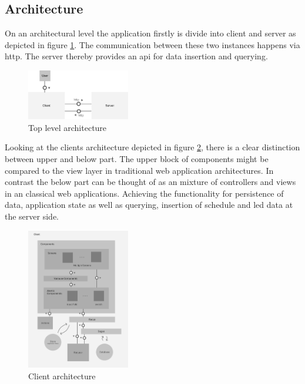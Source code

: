 \documentclass[conference]{IEEEtran}
\begin{document}
\subsection{Architecture}
On an architectural level the application firstly is divide into client and server as depicted in figure \ref{topLevelArch}.
The communication between these two instances happens via http. The server thereby provides an api for data insertion and
querying.

\begin{figure}[H]
    \centering
    \includegraphics[width=0.4\textwidth]{top_level_architecture}
    \caption{Top level architecture}
    \label{topLevelArch}
\end{figure}

Looking at the clients architecture depicted in figure \ref{clientArch}, there is a clear distinction between upper and below
part. The upper block of components might be compared to the view layer in traditional web application architectures. In contrast
the below part can be thought of as an mixture of controllers and views in an classical web applications. Achieving the functionality
for persistence of data, application state as well as querying, insertion of schedule and led data at the server side.

\begin{figure}
    \centering
    \includegraphics[width=0.4\textwidth]{client_architecture}
    \caption{Client architecture}
    \label{clientArch}
\end{figure}
\end{document}
